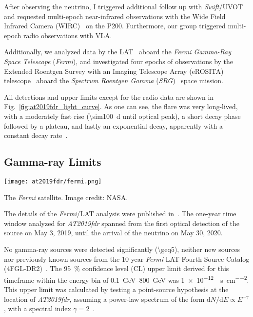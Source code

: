 After observing the neutrino, I triggered additional follow up with \textit{Swift}/UVOT and requested multi-epoch near-infrared observations with the Wide Field Infrared Camera (WIRC)~ on the P200. Furthermore, our group triggered multi-epoch radio observations with VLA.

Additionally, we analyzed data by the LAT~\cite{Atwood2009} aboard the \textit{Fermi Gamma-Ray Space Telescope} (\textit{Fermi}), and investigated four epochs of observations by the Extended Roentgen Survey with an Imaging Telescope Array (eROSITA) telescope~ aboard the \textit{Spectrum Roentgen Gamma} (\textit{SRG})~ space mission.

All detections and upper limits except for the radio data are shown in Fig.~\ref{fig:at2019fdr_light_curve}. As one can see, the flare was very long-lived, with a moderately fast rise (\SI{\sim100}{\day} until optical peak), a short decay phase followed by a plateau, and lastly an exponential decay, apparently with a constant decay rate~.

\subsection{Gamma-ray Limits}

\begin{marginfigure}
    \texttt{[image: at2019fdr/fermi.png]}
    \caption[The \textit{Fermi} satellite]{The \textit{Fermi} satellite. Image credit: NASA.}
\end{marginfigure}

The details of the \textit{Fermi}/LAT analysis were published in~. The one-year time window analyzed for \emph{AT2019fdr} spanned from the first optical detection of the source on May 3, 2019, until the arrival of the neutrino on May 30, 2020.

No gamma-ray sources were detected significantly (\SI{\geq5}{\sigma}), neither new sources nor previously known sources from the 10 year \textit{Fermi} LAT Fourth Source Catalog (4FGL-DR2)~. The \SI{95}{\percent} confidence level (CL) upper limit derived for this timeframe within the energy bin of \SIrange{0.1}{800}{\giga\eV} was \SI{1e-12}{\erg\per\s\per\square\cm}. This upper limit was calculated by testing a point-source hypothesis at the location of \emph{AT2019fdr}, assuming a power-law spectrum of the form $\text{d}N/\text{d}E \propto E^{-\gamma}$, with a spectral index $\gamma=2$~\cite{Velzen2021}.

